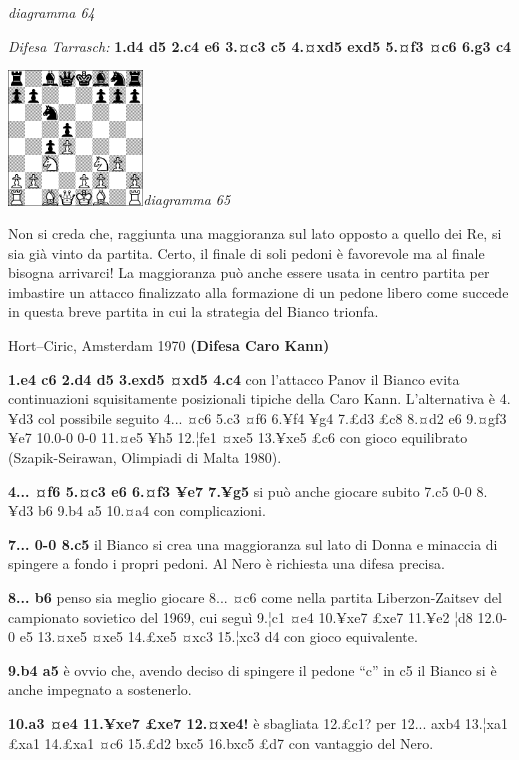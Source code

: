 \documentclass[
]{article}
\begin{document}
\emph{diagramma 64}

\emph{Difesa Tarrasch:} \textbf{1.d4 d5 2.c4 e6 3.¤c3 c5 4.¤xd5 exd5
5.¤f3 ¤c6 6.g3 c4}

\includegraphics[width=1.40972in,height=1.40972in]{vertopal_109f12be458a423d8f3cc838880eaea2/media/image65.png}\emph{diagramma
65}

Non si creda che, raggiunta una maggioranza sul lato opposto a quello
dei Re, si sia già vinto da partita. Certo, il finale di soli pedoni è
favorevole ma al finale bisogna arrivarci! La maggioranza può anche
essere usata in centro partita per imbastire un attacco finalizzato alla
formazione di un pedone libero come succede in questa breve partita in
cui la strategia del Bianco trionfa.

Hort--Ciric, Amsterdam 1970 \textbf{(Difesa Caro Kann)}

\textbf{1.e4 c6 2.d4 d5 3.exd5 ¤xd5 4.c4} con l'attacco Panov il Bianco
evita continuazioni squisitamente posizionali tipiche della Caro Kann.
L'alternativa è 4.¥d3 col possibile seguito 4... ¤c6 5.c3 ¤f6 6.¥f4 ¥g4
7.£d3 £c8 8.¤d2 e6 9.¤gf3 ¥e7 10.0-0 0-0 11.¤e5 ¥h5 12.¦fe1 ¤xe5 13.¥xe5
£c6 con gioco equilibrato (Szapik-Seirawan, Olimpiadi di Malta 1980).

\textbf{4... ¤f6 5.¤c3 e6 6.¤f3 ¥e7 7.¥g5} si può anche giocare subito
7.c5 0-0 8.¥d3 b6 9.b4 a5 10.¤a4 con complicazioni.

\textbf{7... 0-0 8.c5} il Bianco si crea una maggioranza sul lato di
Donna e minaccia di spingere a fondo i propri pedoni. Al Nero è
richiesta una difesa precisa.

\textbf{8... b6} penso sia meglio giocare 8... ¤c6 come nella partita
Liberzon-Zaitsev del campionato sovietico del 1969, cui seguì 9.¦c1 ¤e4
10.¥xe7 £xe7 11.¥e2 ¦d8 12.0-0 e5 13.¤xe5 ¤xe5 14.£xe5 ¤xc3 15.¦xc3 d4
con gioco equivalente.

\textbf{9.b4 a5} è ovvio che, avendo deciso di spingere il pedone ``c''
in c5 il Bianco si è anche impegnato a sostenerlo.

\textbf{10.a3 ¤e4 11.¥xe7 £xe7 12.¤xe4!} è sbagliata 12.£c1? per 12...
axb4 13.¦xa1 £xa1 14.£xa1 ¤c6 15.£d2 bxc5 16.bxc5 £d7 con vantaggio del
Nero.
\end{document}
